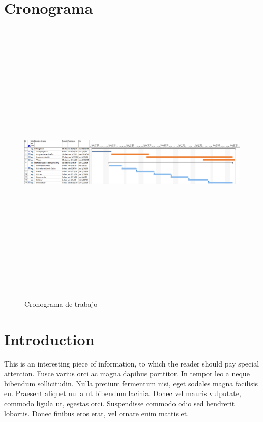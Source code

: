 \documentclass{article}
\begin{document}
\section{Cronograma}

\begin{figure}[H]
		\centering
		\includegraphics[width=18cm, height=14cm, keepaspectratio]{./img/cronograma_proyecto.png}
		\caption{Cronograma de trabajo }
		\label{fig:cronograma}
	\end{figure}


\section*{Introduction} %

\begin{info} %
	This is an interesting piece of information, to which the reader should pay special attention. Fusce varius orci ac magna dapibus porttitor. In tempor leo a neque bibendum sollicitudin. Nulla pretium fermentum nisi, eget sodales magna facilisis eu. Praesent aliquet nulla ut bibendum lacinia. Donec vel mauris vulputate, commodo ligula ut, egestas orci. Suspendisse commodo odio sed hendrerit lobortis. Donec finibus eros erat, vel ornare enim mattis et.
\end{info}
\end{document}

